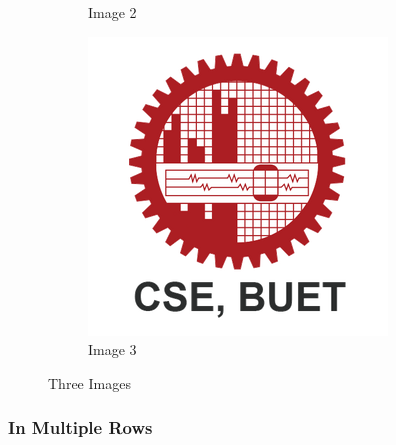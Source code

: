 \documentclass{article}
\begin{document}
\begin{figure}[htbp]
\begin{subfigure}{0.3\textwidth}
         \caption{Image 2}
     \end{subfigure}
     \hfill
     \begin{subfigure}{0.3\textwidth}
         \centering
         \includegraphics[width=\textwidth]{Images/CSE_BUET.png}
         \caption{Image 3}
     \end{subfigure}
        \caption{Three Images}
\end{figure}

\pagebreak

\subsubsection{In Multiple Rows}
\end{document}
